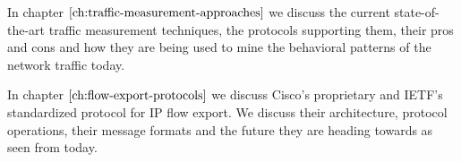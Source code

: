 
\vspace{50pt}

In chapter $\ref{ch:traffic-measurement-approaches}$ we discuss the current state-of-the-art traffic measurement techniques, the protocols supporting them, their pros and cons and how they are being used to mine the behavioral patterns of the network traffic today. 

In chapter $\ref{ch:flow-export-protocols}$ we discuss Cisco's proprietary and \ac{IETF}'s standardized protocol for \ac{IP} flow export. We discuss their architecture, protocol operations, their message formats and the future they are heading towards as seen from today.

